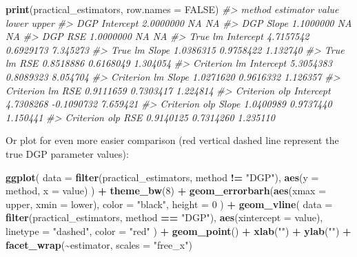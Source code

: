 \documentclass[
]{book}
\newenvironment{Shaded}{\begin{snugshade}}{\end{snugshade}}
\newcommand{\CommentTok}[1]{\textcolor[rgb]{0.56,0.35,0.01}{\textit{#1}}}
\newcommand{\DataTypeTok}[1]{\textcolor[rgb]{0.13,0.29,0.53}{#1}}
\newcommand{\DecValTok}[1]{\textcolor[rgb]{0.00,0.00,0.81}{#1}}
\newcommand{\KeywordTok}[1]{\textcolor[rgb]{0.13,0.29,0.53}{\textbf{#1}}}
\newcommand{\NormalTok}[1]{#1}
\newcommand{\OperatorTok}[1]{\textcolor[rgb]{0.81,0.36,0.00}{\textbf{#1}}}
\newcommand{\OtherTok}[1]{\textcolor[rgb]{0.56,0.35,0.01}{#1}}
\newcommand{\StringTok}[1]{\textcolor[rgb]{0.31,0.60,0.02}{#1}}
\begin{document}
\begin{Shaded}
\begin{Highlighting}[]
\KeywordTok{print}\NormalTok{(practical\_estimators, }\DataTypeTok{row.names =} \OtherTok{FALSE}\NormalTok{)}
\CommentTok{\#>         method estimator     value      lower    upper}
\CommentTok{\#>            DGP Intercept 2.0000000         NA       NA}
\CommentTok{\#>            DGP     Slope 1.1000000         NA       NA}
\CommentTok{\#>            DGP       RSE 1.0000000         NA       NA}
\CommentTok{\#>        True lm Intercept 4.7157542  0.6929173 7.345273}
\CommentTok{\#>        True lm     Slope 1.0386315  0.9758422 1.132740}
\CommentTok{\#>        True lm       RSE 0.8518886  0.6168049 1.304054}
\CommentTok{\#>   Criterion lm Intercept 5.3054383  0.8089323 8.054704}
\CommentTok{\#>   Criterion lm     Slope 1.0271620  0.9616332 1.126357}
\CommentTok{\#>   Criterion lm       RSE 0.9111659  0.7303417 1.224814}
\CommentTok{\#>  Criterion olp Intercept 4.7308268 {-}0.1090732 7.659421}
\CommentTok{\#>  Criterion olp     Slope 1.0400989  0.9737440 1.150441}
\CommentTok{\#>  Criterion olp       RSE 0.9140125  0.7314260 1.235110}
\end{Highlighting}
\end{Shaded}

Or plot for even more easier comparison (red vertical dashed line represent the true DGP parameter values):

\begin{Shaded}
\begin{Highlighting}[]
\KeywordTok{ggplot}\NormalTok{(}
  \DataTypeTok{data =} \KeywordTok{filter}\NormalTok{(practical\_estimators, method }\OperatorTok{!=}\StringTok{ "DGP"}\NormalTok{),}
  \KeywordTok{aes}\NormalTok{(}\DataTypeTok{y =}\NormalTok{ method, }\DataTypeTok{x =}\NormalTok{ value)}
\NormalTok{) }\OperatorTok{+}
\StringTok{  }\KeywordTok{theme\_bw}\NormalTok{(}\DecValTok{8}\NormalTok{) }\OperatorTok{+}
\StringTok{  }\KeywordTok{geom\_errorbarh}\NormalTok{(}\KeywordTok{aes}\NormalTok{(}\DataTypeTok{xmax =}\NormalTok{ upper, }\DataTypeTok{xmin =}\NormalTok{ lower),}
    \DataTypeTok{color =} \StringTok{"black"}\NormalTok{,}
    \DataTypeTok{height =} \DecValTok{0}
\NormalTok{  ) }\OperatorTok{+}
\StringTok{  }\KeywordTok{geom\_vline}\NormalTok{(}
    \DataTypeTok{data =} \KeywordTok{filter}\NormalTok{(practical\_estimators, method }\OperatorTok{==}\StringTok{ "DGP"}\NormalTok{),}
    \KeywordTok{aes}\NormalTok{(}\DataTypeTok{xintercept =}\NormalTok{ value),}
    \DataTypeTok{linetype =} \StringTok{"dashed"}\NormalTok{, }\DataTypeTok{color =} \StringTok{"red"}
\NormalTok{  ) }\OperatorTok{+}
\StringTok{  }\KeywordTok{geom\_point}\NormalTok{() }\OperatorTok{+}
\StringTok{  }\KeywordTok{xlab}\NormalTok{(}\StringTok{""}\NormalTok{) }\OperatorTok{+}
\StringTok{  }\KeywordTok{ylab}\NormalTok{(}\StringTok{""}\NormalTok{) }\OperatorTok{+}
\StringTok{  }\KeywordTok{facet\_wrap}\NormalTok{(}\OperatorTok{\textasciitilde{}}\NormalTok{estimator, }\DataTypeTok{scales =} \StringTok{"free\_x"}\NormalTok{)}
\end{Highlighting}
\end{Shaded}
\end{document}
